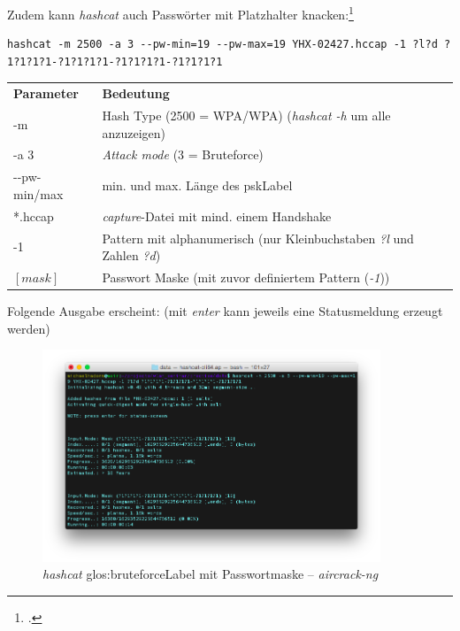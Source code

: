 Zudem kann \textit{hashcat} auch Passwörter mit Platzhalter knacken:\footcite{mask_attack_hashcat_wiki_2015-04-13}
\begin{lstlisting}[style=lstStyleFramed]
hashcat -m 2500 -a 3 --pw-min=19 --pw-max=19 YHX-02427.hccap -1 ?l?d ?1?1?1?1-?1?1?1?1-?1?1?1?1-?1?1?1?1
\end{lstlisting}
\begin{tabular}{l l}
	\textbf{Parameter} & \textbf{Bedeutung}\\
	-m & Hash Type (2500 = WPA/WPA) (\textit{hashcat -h} um alle anzuzeigen)\\
	-a 3 & \textit{Attack mode} (3 = Bruteforce)\\
	-{}-pw-min/max & min. und max. Länge des \gls{pskLabel}\\
	*.hccap & \textit{capture}-Datei mit mind. einem Handshake\\
	-1 & Pattern mit alphanumerisch (nur Kleinbuchstaben \textit{?l} und Zahlen \textit{?d})\\
	$[mask]$ & Passwort Maske (mit zuvor definiertem Pattern (\textit{-1}))\\
\end{tabular}

Folgende Ausgabe erscheint: (mit \textit{enter} kann jeweils eine Statusmeldung erzeugt werden)
\begin{figure}[H]
	\centering
	\includegraphics[width=0.9\textwidth]{images/wpa/hashcat_bruteforce_pattern.png}
	\caption{\textit{hashcat} \gls{glos:bruteforceLabel} mit Passwortmaske -- \textit{aircrack-ng}}\label{fig:hashcat_bruteforce_pattern}
\end{figure}

